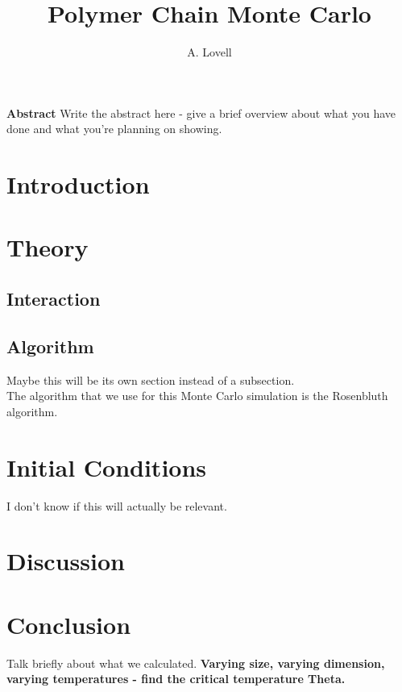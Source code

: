 \documentclass{article}
\begin{document}
\title{Polymer Chain Monte Carlo}
\author{A. Lovell}
\maketitle

\noindent \textbf{Abstract}  Write the abstract here - give a brief overview about what you have done and what you're planning on showing.

\begin{multicols}{2}

\section{Introduction}

\section{Theory}

\subsection{Interaction}

\subsection{Algorithm}

Maybe this will be its own section instead of a subsection.\\

The algorithm that we use for this Monte Carlo simulation is the Rosenbluth algorithm.  

\section{Initial Conditions}

I don't know if this will actually be relevant.  

\section{Discussion}

\section{Conclusion}

Talk briefly about what we calculated.  \textbf{Varying size, varying dimension, varying temperatures - find the critical temperature Theta.}\\


\end{multicols}
\end{document}
